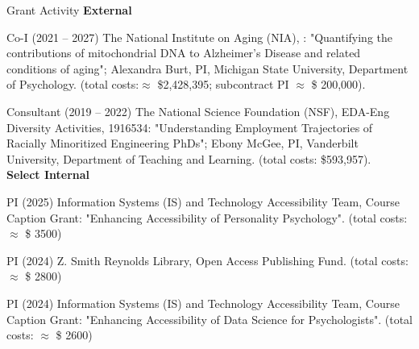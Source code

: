\begin{rSection}{\textrm{Grant Activity}}%
{\large \textbf{External}}%
\begin{etaremune}
\item Co-I (2021 – 2027) The National Institute on Aging (NIA), : "Quantifying the contributions of mitochondrial DNA to Alzheimer's Disease and related conditions of aging"; Alexandra Burt, PI, Michigan State University, Department of Psychology. (total costs:$\approx$ \$2,428,395; subcontract PI $\approx$  \$ 200,000).

\item Consultant (2019 – 2022) The National Science Foundation (NSF), EDA-Eng Diversity Activities, 1916534: "Understanding Employment Trajectories of Racially Minoritized Engineering PhDs"; Ebony McGee, PI, Vanderbilt University, Department of Teaching and Learning. (total costs: \$593,957).
\smallskip\\
\hspace*{-8mm}\large{\bf{Select Internal}}%
\item PI (2025) Information Systems (IS) and Technology Accessibility Team, Course Caption Grant: "Enhancing Accessibility of Personality Psychology". (total costs: $\approx$ \$ 3500)%
\item PI (2024) Z. Smith Reynolds Library, Open Access Publishing Fund. (total costs: $\approx$ \$ 2800) %
\item PI (2024) Information Systems (IS) and Technology Accessibility Team, Course Caption Grant: "Enhancing Accessibility of Data Science for Psychologists". (total costs: $\approx$ \$ 2600)%
\end{etaremune}
\end{rSection}